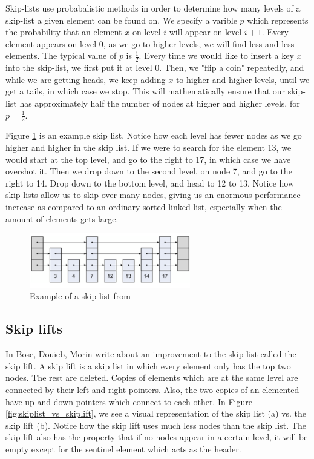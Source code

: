 \documentclass[oribibl]{llncs}
\begin{document}
Skip-lists use probabalistic methods in order to determine how many levels of a skip-list a given element can be found on. We specify a varible $p$ which represents the probability that an element $x$ on level $i$ will appear on level $i+1$. Every element appears on level 0, as we go to higher levels, we will find less and less elements. The typical value of $p$ is $\frac{1}{2}$. Every time we would like to insert a key $x$ into the skip-list, we first put it at level 0. Then, we "flip a coin" repeatedly, and while we are getting heads, we keep adding $x$ to higher and higher levels, until we get a tails, in which case we stop. This will mathematically ensure that our skip-list has approximately half the number of nodes at higher and higher levels, for $p=\frac{1}{2}$.

Figure \ref{fig:skip_list} is an example skip list. Notice how each level has fewer nodes as we go higher and higher in the skip list. If we were to search for the element 13, we would start at the top level, and go to the right to 17, in which case we have overshot it. Then we drop down to the second level, on node 7, and go to the right to 14. Drop down to the bottom level, and head to 12 to 13. Notice how skip lists allow us to skip over many nodes, giving us an enormous performance increase as compared to an ordinary sorted linked-list, especially when the amount of elements gets large.

\begin{figure}[here]
\center
\includegraphics[width=7cm]{images/skip_list1}
\caption{Example of a skip-list from \cite{skip_list}}
\label{fig:skip_list}
\end{figure}

\subsection{Skip lifts}

In \cite{skip_lift} Bose, Douïeb, Morin write about an improvement to the skip list called the skip lift. A skip lift is a skip list in which every element only has the top two nodes. The rest are deleted. Copies of elements which are at the same level are connected by their left and right pointers. Also, the two copies of an elemented have up and down pointers which connect to each other. In Figure \ref{fig:skiplist_vs_skiplift}, we see a visual representation of the skip list (a) vs. the skip lift (b). Notice how the skip lift uses much less nodes than the skip list. The skip lift also has the property that if no nodes appear in a certain level, it will be empty except for the sentinel element which acts as the header.
\end{document}
